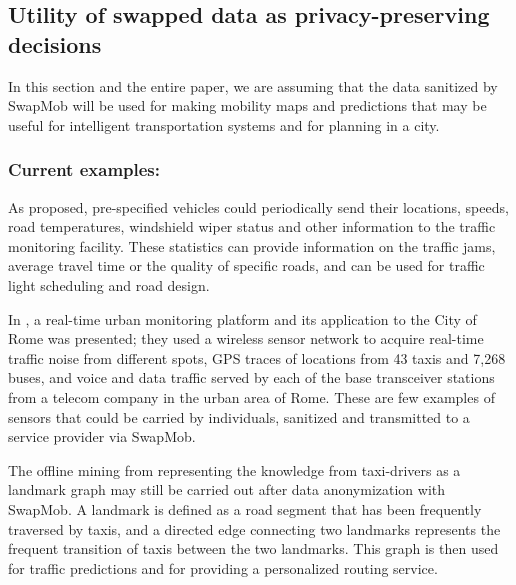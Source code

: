\documentclass[times,twocolumn,final,authoryear]{elsarticle}
\begin{document}
\subsection{Utility of swapped data as privacy-preserving decisions}\label{sect:util}
In this section and the entire paper, we are assuming that the data sanitized by SwapMob will be used for making mobility maps and predictions that may be useful for intelligent transportation systems and for planning in a city.
%

\subsubsection{Current examples:}
As \cite{Hoh2005} proposed, pre-specified vehicles could periodically send their locations, speeds, road temperatures, windshield wiper status and other information to the traffic monitoring facility. These statistics can provide information on the traffic jams, average travel time or the quality of specific roads, and can be used for traffic light scheduling and road design.

%

In \cite{Calabrese2011}, a real-time urban monitoring platform and its application to the City of Rome was presented; they used
a wireless sensor network to acquire real-time traffic noise from different spots, GPS traces of locations from 43 taxis and 7,268 buses, and voice and data traffic served by each of the base transceiver stations from a telecom company in the urban area of Rome. These are few examples of sensors that could be carried by individuals, sanitized and transmitted to a service provider via SwapMob.

The offline mining from \cite{Yuan2011} representing the knowledge from taxi-drivers as a landmark graph may still be carried out after data anonymization with SwapMob. 
A landmark is defined as a road segment that has been frequently traversed by taxis, and a directed edge connecting two landmarks represents the frequent transition of taxis between the two landmarks. This graph is then used for traffic predictions and for providing a personalized routing service.
\end{document}
